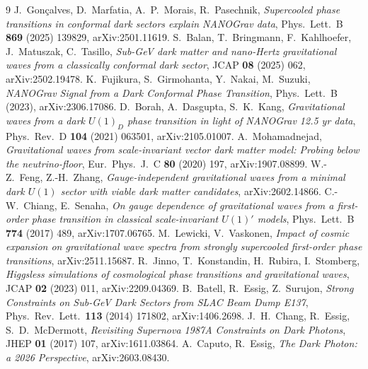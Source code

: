 \documentclass[11pt]{article}
\begin{document}
\begin{thebibliography}{9}
 J.~Gon\c{c}alves, D.~Marfatia, A.~P.~Morais,
R.~Pasechnik, \emph{Supercooled phase transitions in conformal dark sectors
explain NANOGrav data}, Phys.\ Lett.\ B \textbf{869} (2025) 139829,
arXiv:2501.11619.
 S.~Balan, T.~Bringmann, F.~Kahlhoefer, J.~Matuszak,
C.~Tasillo, \emph{Sub-GeV dark matter and nano-Hertz gravitational waves from a
classically conformal dark sector}, JCAP \textbf{08} (2025) 062,
arXiv:2502.19478.
 K.~Fujikura, S.~Girmohanta, Y.~Nakai, M.~Suzuki,
\emph{NANOGrav Signal from a Dark Conformal Phase Transition},
Phys.\ Lett.\ B (2023), arXiv:2306.17086.
 D.~Borah, A.~Dasgupta, S.~K.~Kang, \emph{Gravitational waves
from a dark $U(1)_D$ phase transition in light of NANOGrav 12.5 yr data},
Phys.\ Rev.\ D \textbf{104} (2021) 063501, arXiv:2105.01007.
 A.~Mohamadnejad, \emph{Gravitational waves from
scale-invariant vector dark matter model: Probing below the neutrino-floor},
Eur.\ Phys.\ J.\ C \textbf{80} (2020) 197, arXiv:1907.08899.
 W.-Z.~Feng, Z.-H.~Zhang, \emph{Gauge-independent gravitational
waves from a minimal dark $U(1)$ sector with viable dark matter candidates},
arXiv:2602.14866.
 C.-W.~Chiang, E.~Senaha, \emph{On gauge dependence of
gravitational waves from a first-order phase transition in classical
scale-invariant $U(1)'$ models}, Phys.\ Lett.\ B \textbf{774} (2017) 489,
arXiv:1707.06765.
 M.~Lewicki, V.~Vaskonen, \emph{Impact of cosmic expansion
on gravitational wave spectra from strongly supercooled first-order phase
transitions}, arXiv:2511.15687.
 R.~Jinno, T.~Konstandin, H.~Rubira, I.~Stomberg,
\emph{Higgsless simulations of cosmological phase transitions and gravitational
waves}, JCAP \textbf{02} (2023) 011, arXiv:2209.04369.
 B.~Batell, R.~Essig, Z.~Surujon, \emph{Strong Constraints
on Sub-GeV Dark Sectors from SLAC Beam Dump E137}, Phys.\ Rev.\ Lett.\
\textbf{113} (2014) 171802, arXiv:1406.2698.
 J.~H.~Chang, R.~Essig, S.~D.~McDermott, \emph{Revisiting
Supernova 1987A Constraints on Dark Photons}, JHEP \textbf{01} (2017) 107,
arXiv:1611.03864.
 A.~Caputo, R.~Essig, \emph{The Dark Photon: a 2026
Perspective}, arXiv:2603.08430.
\end{thebibliography}
\end{document}
